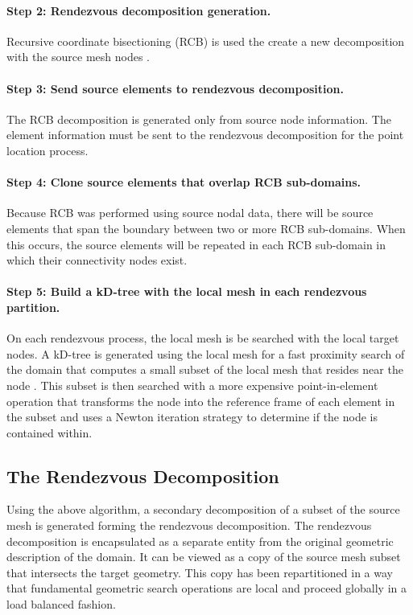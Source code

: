 \documentclass[letterpaper,12pt]{article}
\begin{document}
\paragraph{Step 2: Rendezvous decomposition generation.}
Recursive coordinate bisectioning (RCB) is used the create a new
decomposition with the source mesh nodes \cite{Berger_1987}.

\paragraph{Step 3: Send source elements to rendezvous decomposition.}
The RCB decomposition is generated only from source node
information. The element information must be sent to the rendezvous
decomposition for the point location process. 

\paragraph{Step 4: Clone source elements that overlap RCB
  sub-domains.}  Because RCB was performed using source nodal data,
there will be source elements that span the boundary between two or
more RCB sub-domains. When this occurs, the source elements will be
repeated in each RCB sub-domain in which their connectivity nodes
exist. 

\paragraph{Step 5: Build a kD-tree with the local mesh in each rendezvous
  partition.}  On each rendezvous process, the local mesh is be
searched with the local target nodes. A kD-tree is generated using the
local mesh for a fast proximity search of the domain that computes a
small subset of the local mesh that resides near the node
\cite{Bentley_1975}. This subset is then searched with a more
expensive point-in-element operation that transforms the node into the
reference frame of each element in the subset and uses a Newton
iteration strategy to determine if the node is contained within.

\subsection{The Rendezvous Decomposition}\label{subsec:rendezvous_decomp}
Using the above algorithm, a secondary decomposition of a subset of
the source mesh is generated forming the rendezvous decomposition. The
rendezvous decomposition is encapsulated as a separate entity from the
original geometric description of the domain. It can be viewed as a
copy of the source mesh subset that intersects the target
geometry. This copy has been repartitioned in a way that fundamental
geometric search operations are local and proceed globally in a load
balanced fashion.
\end{document}

